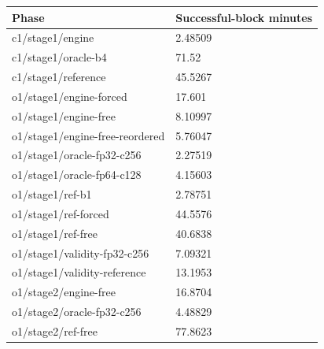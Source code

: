 \begin{tabular}{ll}
\toprule
Phase & Successful-block minutes \\
\midrule
c1/stage1/engine & 2.48509 \\
c1/stage1/oracle-b4 & 71.52 \\
c1/stage1/reference & 45.5267 \\
o1/stage1/engine-forced & 17.601 \\
o1/stage1/engine-free & 8.10997 \\
o1/stage1/engine-free-reordered & 5.76047 \\
o1/stage1/oracle-fp32-c256 & 2.27519 \\
o1/stage1/oracle-fp64-c128 & 4.15603 \\
o1/stage1/ref-b1 & 2.78751 \\
o1/stage1/ref-forced & 44.5576 \\
o1/stage1/ref-free & 40.6838 \\
o1/stage1/validity-fp32-c256 & 7.09321 \\
o1/stage1/validity-reference & 13.1953 \\
o1/stage2/engine-free & 16.8704 \\
o1/stage2/oracle-fp32-c256 & 4.48829 \\
o1/stage2/ref-free & 77.8623 \\
\bottomrule
\end{tabular}
